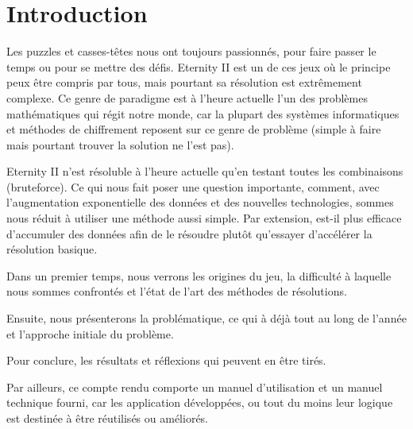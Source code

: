\documentclass{article}
\begin{document}
	
	\renewcommand{\labelitemi}{$\bullet$}
	\renewcommand{\labelitemii}{$\cdot$}
	\renewcommand{\labelitemiii}{$\diamond$}
	\renewcommand{\labelitemiv}{$\ast$}
	
	\newcommand{\HRule}{\rule{\linewidth}{0.5mm}}
	
	
	
	
	\section{Introduction}
	
	Les puzzles et casses-têtes nous ont toujours passionnés, pour faire passer le temps ou pour se mettre des défis. Eternity II est un de ces jeux où le principe peux être compris par tous, mais pourtant sa résolution est extrêmement complexe. Ce genre de paradigme est à l'heure actuelle l'un des problèmes mathématiques qui régit notre monde, car la plupart des systèmes informatiques et méthodes de chiffrement reposent sur ce genre de problème (simple à faire mais pourtant trouver la solution ne l'est pas).
	
	Eternity II n'est résoluble à l'heure actuelle qu'en testant toutes les combinaisons (bruteforce). Ce qui nous fait poser une question importante, comment, avec l'augmentation exponentielle des données et des nouvelles technologies, sommes nous réduit à utiliser une méthode aussi simple.
	Par extension, est-il plus efficace d'accumuler des données afin de le résoudre plutôt qu'essayer d'accélérer la résolution basique. 
	
	Dans un premier temps, nous verrons les origines du jeu, la difficulté à laquelle nous sommes confrontés et l'état de l'art des méthodes de résolutions.
	
	Ensuite, nous présenterons la problématique, ce qui à déjà tout au long de l'année et l'approche initiale du problème.
	
	Pour conclure, les résultats et réflexions qui peuvent en être tirés.
	
	Par ailleurs, ce compte rendu comporte un manuel d'utilisation et un manuel technique fourni, car les application développées, ou tout du moins leur logique est destinée à être réutilisés ou améliorés.
	
	
	\newpage
	
	
	\newpage
	
	
\end{document}
